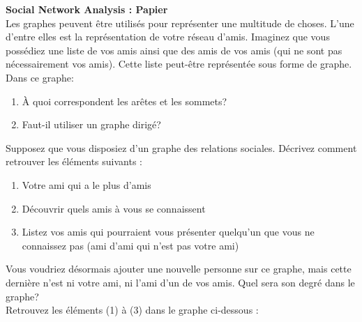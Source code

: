 \begin{Exercice}[10 minutes] \textbf{Social Network Analysis : Papier}\\
    Les graphes peuvent être utilisés pour représenter une multitude de choses.  L'une d'entre elles est la représentation de votre réseau d'amis. Imaginez que vous possédiez une liste de vos amis ainsi que des amis de vos amis (qui ne sont pas nécessairement vos amis). Cette liste peut-être représentée sous forme de graphe. Dans ce graphe\!:
    \begin{enumerate}
        \item  À quoi correspondent les arêtes et les sommets? 
        \item Faut-il utiliser un graphe dirigé?
    \end{enumerate}
    Supposez que vous disposiez d'un graphe des relations sociales. Décrivez comment retrouver les éléments suivants :
    \begin{enumerate}
        \item Votre ami qui a le plus d'amis
        \item Découvrir quels amis à vous se connaissent
        \item Listez vos amis qui pourraient vous présenter quelqu'un que vous ne connaissez pas (ami d'ami qui n'est pas votre ami)
    \end{enumerate}
    Vous voudriez désormais ajouter une nouvelle personne sur ce graphe, mais cette dernière n'est ni votre ami, ni l'ami d'un de vos amis. Quel sera son degré dans le graphe?\\
    
    Retrouvez les éléments (1) à (3) dans le graphe ci-dessous :\\
    \begin{center}
\end{center}
\end{Exercice}

